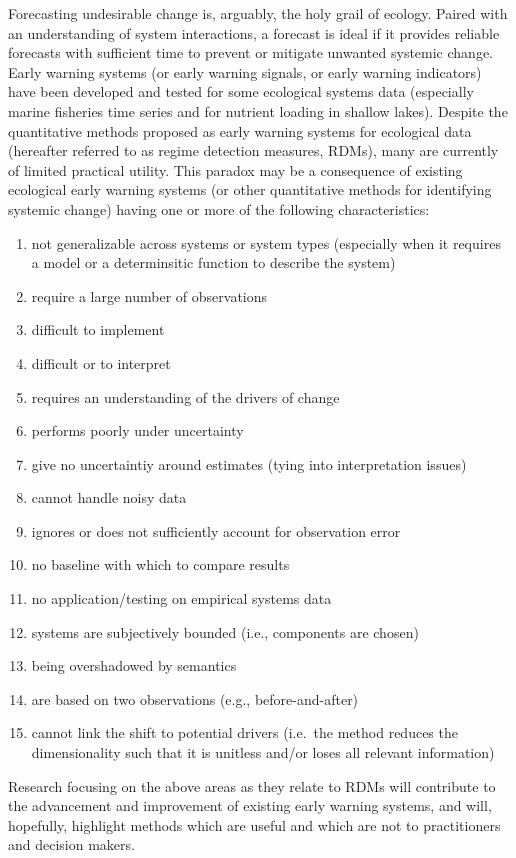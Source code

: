 \documentclass[12pt,twoside,openany]{reedthesis}
\providecommand{\tightlist}{%
  \setlength{\itemsep}{0pt}\setlength{\parskip}{0pt}}
\begin{document}
Forecasting undesirable change is, arguably, the holy grail of ecology.
Paired with an understanding of system interactions, a forecast is ideal
if it provides reliable forecasts with sufficient time to prevent or
mitigate unwanted systemic change. Early warning systems (or early
warning signals, or early warning indicators) have been developed and
tested for some ecological systems data (especially marine fisheries
time series and for nutrient loading in shallow lakes). Despite the
quantitative methods proposed as early warning systems for ecological
data (hereafter referred to as regime detection measures, RDMs), many
are currently of limited practical utility. This paradox may be a
consequence of existing ecological early warning systems (or other
quantitative methods for identifying systemic change) having one or more
of the following characteristics:
\begin{enumerate}
\def\labelenumi{\arabic{enumi}.}
\tightlist
\item
  not generalizable across systems or system types (especially when it
  requires a model or a determinsitic function to describe the system)
\item
  require a large number of observations
\item
  difficult to implement
\item
  difficult or to interpret
\item
  requires an understanding of the drivers of change
\item
  performs poorly under uncertainty
\item
  give no uncertaintiy around estimates (tying into interpretation
  issues)
\item
  cannot handle noisy data
\item
  ignores or does not sufficiently account for observation error
\item
  no baseline with which to compare results
\item
  no application/testing on empirical systems data
\item
  systems are subjectively bounded (i.e., components are chosen)
\item
  being overshadowed by semantics
\item
  are based on two observations (e.g., before-and-after)
\item
  cannot link the shift to potential drivers (i.e.~the method reduces
  the dimensionality such that it is unitless and/or loses all relevant
  information)
\end{enumerate}
Research focusing on the above areas as they relate to RDMs will
contribute to the advancement and improvement of existing early warning
systems, and will, hopefully, highlight methods which are useful and
which are not to practitioners and decision makers.
\end{document}
